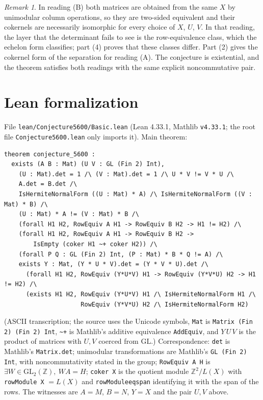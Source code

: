 \documentclass[11pt]{article}
\renewcommand{\_}{\oldus\allowbreak}
\theoremstyle{remark}
\newtheorem{remark}[theorem]{Remark}
\newcommand{\Z}{\mathbb{Z}}
\newcommand{\GL}{\mathrm{GL}}
\begin{document}
\begin{remark}
In reading (B) both matrices are obtained from the same $X$ by unimodular column
operations, so they are two-sided equivalent and their cokernels are necessarily
isomorphic for every choice of $X$, $U$, $V$. In that reading, the layer that the
determinant fails to see is the row-equivalence class, which the echelon form
classifies; part (4) proves that these classes differ. Part (2) gives the cokernel
form of the separation for reading (A). The conjecture is existential, and the
theorem satisfies both readings with the same explicit noncommutative pair.
\end{remark}

\section{Lean formalization}
File \texttt{lean/Conjecture5600/Basic.lean} (Lean 4.33.1, Mathlib \texttt{v4.33.1}; the
root file \texttt{Conjecture5600.lean} only imports it). Main theorem:
\begin{verbatim}
theorem conjecture_5600 :
  exists (A B : Mat) (U V : GL (Fin 2) Int),
    (U : Mat).det = 1 /\ (V : Mat).det = 1 /\ U * V != V * U /\
    A.det = B.det /\
    IsHermiteNormalForm ((U : Mat) * A) /\ IsHermiteNormalForm ((V : Mat) * B) /\
    (U : Mat) * A != (V : Mat) * B /\
    (forall H1 H2, RowEquiv A H1 -> RowEquiv B H2 -> H1 != H2) /\
    (forall H1 H2, RowEquiv A H1 -> RowEquiv B H2 ->
        IsEmpty (coker H1 ~+ coker H2)) /\
    (forall P Q : GL (Fin 2) Int, (P : Mat) * B * Q != A) /\
    exists Y : Mat, (Y * U * V).det = (Y * V * U).det /\
      (forall H1 H2, RowEquiv (Y*U*V) H1 -> RowEquiv (Y*V*U) H2 -> H1 != H2) /\
      (exists H1 H2, RowEquiv (Y*U*V) H1 /\ IsHermiteNormalForm H1 /\
                     RowEquiv (Y*V*U) H2 /\ IsHermiteNormalForm H2)
\end{verbatim}
(ASCII transcription; the source uses the Unicode symbols, \texttt{Mat} is
\texttt{Matrix (Fin 2) (Fin 2) Int}, \texttt{\~{}+} is Mathlib's additive equivalence
\texttt{AddEquiv}, and $Y\,U\,V$ is the product of matrices with $U,V$ coerced from
$\GL$.) Correspondence: \texttt{det} is Mathlib's \texttt{Matrix.det}; unimodular
transformations are Mathlib's \texttt{GL (Fin 2) Int}, with noncommutativity stated in
the group; \texttt{RowEquiv A H} is $\exists W\in\GL_2(\Z),\ WA=H$;
\texttt{coker X} is the quotient module $\Z^2/L(X)$ with \texttt{rowModule X} $=L(X)$
and \texttt{rowModule\_eq\_span} identifying it with the span of the rows. The witnesses
are $A=M$, $B=N$, $Y=X$ and the pair $U,V$ above.
\end{document}
